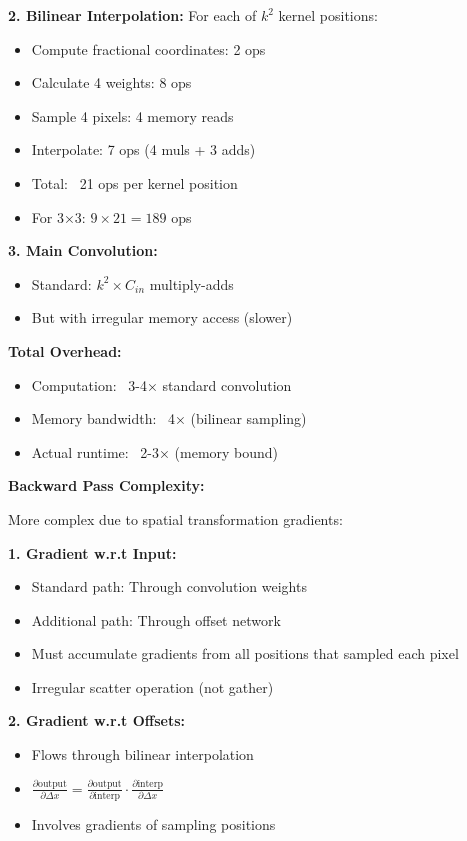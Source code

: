 \documentclass[12pt]{article}
\newcommand{\explanation}[1]{{\color{explanationcolor}#1}}
\begin{document}
\begin{enumerate}[(a)]
{{    \textbf{2. Bilinear Interpolation:}
    For each of $k^2$ kernel positions:
    \begin{itemize}
        \item Compute fractional coordinates: 2 ops
        \item Calculate 4 weights: 8 ops
        \item Sample 4 pixels: 4 memory reads
        \item Interpolate: 7 ops (4 muls + 3 adds)
        \item Total: ~21 ops per kernel position
        \item For 3×3: $9 \times 21 = 189$ ops
    \end{itemize}
    
    \textbf{3. Main Convolution:}
    \begin{itemize}
        \item Standard: $k^2 \times C_{in}$ multiply-adds
        \item But with irregular memory access (slower)
    \end{itemize}
    
    \textbf{Total Overhead:}
    \begin{itemize}
        \item Computation: ~3-4× standard convolution
        \item Memory bandwidth: ~4× (bilinear sampling)
        \item Actual runtime: ~2-3× (memory bound)
    \end{itemize}
    }
    
    \textbf{Backward Pass Complexity:}
    
    \explanation{
    More complex due to spatial transformation gradients:
    
    \textbf{1. Gradient w.r.t Input:}
    \begin{itemize}
        \item Standard path: Through convolution weights
        \item Additional path: Through offset network
        \item Must accumulate gradients from all positions that sampled each pixel
        \item Irregular scatter operation (not gather)
    \end{itemize}
    
    \textbf{2. Gradient w.r.t Offsets:}
    \begin{itemize}
        \item Flows through bilinear interpolation
        \item $\frac{\partial \text{output}}{\partial \Delta x} = \frac{\partial \text{output}}{\partial \text{interp}} \cdot \frac{\partial \text{interp}}{\partial \Delta x}$
        \item Involves gradients of sampling positions
    \end{itemize}
    
}}
\end{enumerate}
\end{document}
